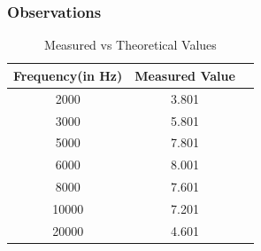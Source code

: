 \documentclass[a4paper,12pt]{article}
\begin{document}
\subsubsection{Observations}
\begin{table}[H]
\centering
\begin{tabular}{|c|c|c|}
\hline
\textbf{Frequency(in Hz)} & \textbf{Measured Value}  \\
\hline
2000 & 3.801    \\
3000& 5.801    \\
5000 & 7.801   \\
6000 & 8.001   \\
8000 & 7.601   \\
10000 & 7.201  \\
20000 & 4.601  \\
\hline
\end{tabular}
\caption{Measured vs Theoretical Values}
\end{table}
\end{document}
